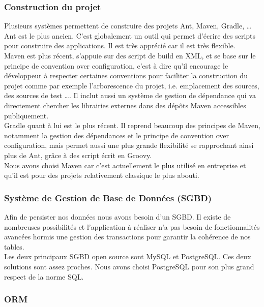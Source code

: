 \subsubsection{Construction du projet}

Plusieurs systèmes permettent de construire des projets Ant, Maven, Gradle, \dots{} Ant est le plus ancien. C'est globalement un outil qui permet d'écrire des scripts pour construire des applications. Il est très apprécié car il est très flexible.\\

Maven est plus récent, s'appuie sur des script de build en XML, et se base sur le principe de \flqq{}convention over configuration\frqq{}, c'est à dire qu'il encourage le développeur à respecter certaines conventions pour faciliter la construction du projet comme par exemple l'arborescence du projet, i.e. emplacement des sources, des sources de test \dots{}. Il inclut aussi un système de gestion de dépendance qui va directement chercher les librairies externes dans des dépôts Maven accessibles publiquement.\\

Gradle quant à lui est le plus récent. Il reprend beaucoup des principes de Maven, notamment la gestion des dépendances et le principe de \flqq{}convention over configuration\frqq{}, mais permet aussi une plus grande flexibilité se rapprochant ainsi plus de Ant, grâce à des script écrit en Groovy.\\

Nous avons choisi Maven car c'est actuellement le plus utilisé en entreprise et qu'il est pour des projets relativement classique le plus abouti.

\subsubsection{Système de Gestion de Base de Données (SGBD)}

Afin de persister nos données nous avons besoin d'un SGBD. Il existe de nombreuses possibilités et l'application à réaliser n'a pas besoin de fonctionnalités avancées hormis une gestion des transactions pour garantir la cohérence de nos tables.\\

Les deux principaux SGBD open source sont MySQL et PostgreSQL. Ces deux solutions sont assez proches. Nous avons choisi PostgreSQL pour son plus grand respect de la norme SQL.

\subsubsection{ORM}

